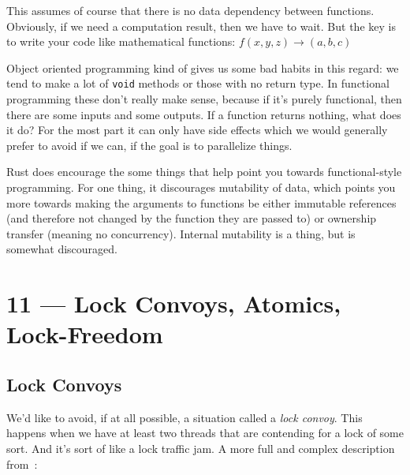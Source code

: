 \documentclass[a4paper]{report}
\begin{document}
This assumes of course that there is no data dependency between functions. Obviously, if we need a computation result, then we have to wait.  But the key is to write your code like mathematical functions: $f(x, y, z) \rightarrow (a, b, c)$

Object oriented programming kind of gives us some bad habits in this regard: we tend to make a lot of \texttt{void} methods or those with no return type. In functional programming these don't really make sense, because if it's purely functional, then there are some inputs and some outputs. If a function returns nothing, what does it do? For the most part it can only have side effects which we would generally prefer to avoid if we can, if the goal is to parallelize things.

Rust does encourage the some things that help point you towards functional-style programming. For one thing, it discourages mutability of data, which points you more towards making the arguments to functions be either immutable references (and therefore not changed by the function they are passed to) or ownership transfer (meaning no concurrency). Internal mutability is a thing, but is somewhat discouraged.









\chapter*{11 --- Lock Convoys, Atomics, Lock-Freedom}


\section*{Lock Convoys}

We'd like to avoid, if at all possible, a situation called a \textit{lock convoy}. This happens when we have at least two threads that are contending for a lock of some sort. And it's sort of like a lock traffic jam. A more full and complex description from~\cite{lockconvoys}:
\end{document}
